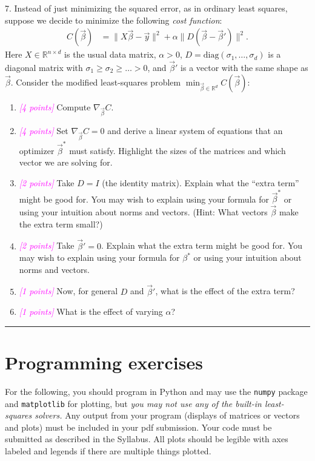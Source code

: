 \documentclass{article}
\newcommand{\R}{\mathbb{R}} %
\newcommand{\points}[1]{\small\textcolor{magenta}{\emph{[#1 points]}} \normalsize}
\begin{document}
\vspace{1em}
7. Instead of just minimizing the squared error, as in ordinary least squares, suppose we decide
to minimize the following {\em cost function}:
\begin{align*}
  C(\vec \beta) &= \| X \vec \beta - \vec y \|^2 + \alpha \| D(\vec \beta - \vec \beta') \|^2.
\end{align*}
Here $X \in \R^{n \times d}$ is the usual data matrix, 
$\alpha > 0$, $D = \mathrm{diag}(\sigma_1, \ldots, \sigma_d)$ 
is a diagonal matrix with $\sigma_1 \geq \sigma_2 \geq \ldots > 0$, 
and $\vec \beta'$ is a vector with the same shape as $\vec \beta$.
Consider the modified least-squares problem
$
\min_{\vec \beta \in \R^d} C(\vec \beta):
$
\begin{enumerate}
\item \points{4} Compute $\nabla_{\vec \beta} C$. 
\item \points{4} Set $\nabla_{\vec \beta} C = 0$ and derive a linear system of equations
  that an optimizer $\vec \beta^*$ must satisfy. 
  Highlight the sizes of the matrices and which vector we are solving for.
\item \points{2} Take $D = I$ (the identity matrix). 
  Explain what the ``extra term'' might be good for.
  You may wish to explain using your formula for $\vec \beta^*$ or using your intuition about norms and vectors.
  (Hint: What vectors $\vec \beta$ make the extra term small?)
\item \points{2} Take $\vec \beta' = 0$.   Explain what the extra term might be good for.
  You may wish to explain using your formula for $\beta^*$ or using your intuition about norms and vectors.
\item \points{1} Now, for general $D$ and $\vec \beta'$, what is the effect of the extra term?
\item \points{1} What is the effect of varying $\alpha$?
\end{enumerate}

\begin{center}
\rule{.5\linewidth}{1pt}
\end{center}

\section*{Programming exercises}

For the following, you should program in Python and may use the
{\tt numpy} package and {\tt matplotlib} for plotting, 
but {\em you may not use any of the built-in least-squares solvers.}
Any output from your program (displays of matrices or vectors and plots) 
must be included in your pdf submission.
Your code must be submitted as described in the Syllabus.
All plots should be legible with axes labeled and legends if there are multiple things plotted.
\end{document}
